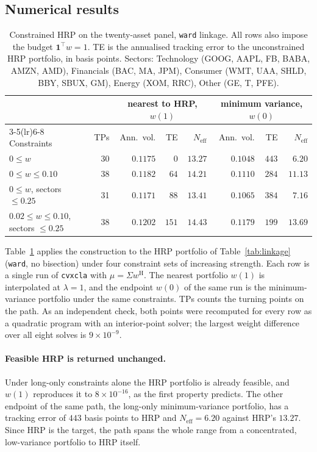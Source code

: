 \documentclass[11pt,a4paper]{article}
\newcommand{\code}[1]{\texttt{#1}}
\begin{document}
\subsection{Numerical results}

\begin{table}[htb]
\centering
\caption{Constrained HRP on the twenty-asset panel, \code{ward} linkage. All
rows also impose the budget $\mathbf{1}^{\top} w = 1$. TE is the annualised
tracking error to the unconstrained HRP portfolio, in basis points. Sectors:
Technology (GOOG, AAPL, FB, BABA, AMZN, AMD), Financials (BAC, MA, JPM),
Consumer (WMT, UAA, SHLD, BBY, SBUX, GM), Energy (XOM, RRC), Other (GE, T,
PFE).}
\label{tab:cla}
\begin{tabular}{lrrrrrrr}
\toprule
& & \multicolumn{3}{c}{nearest to HRP, $w(1)$}
  & \multicolumn{3}{c}{minimum variance, $w(0)$} \\
\cmidrule(lr){3-5}\cmidrule(lr){6-8}
Constraints & TPs & Ann.\ vol. & TE & $N_{\mathrm{eff}}$
  & Ann.\ vol. & TE & $N_{\mathrm{eff}}$ \\
\midrule
$0 \le w$                          & 30 & $0.1175$ & $0$   & $13.27$ & $0.1048$ & $443$ & $6.20$ \\
$0 \le w \le 0.10$                 & 38 & $0.1182$ & $64$  & $14.21$ & $0.1110$ & $284$ & $11.13$ \\
$0 \le w$, sectors $\le 0.25$      & 31 & $0.1171$ & $88$  & $13.41$ & $0.1065$ & $384$ & $7.16$ \\
$0.02 \le w \le 0.10$, sectors $\le 0.25$
                                   & 38 & $0.1202$ & $151$ & $14.43$ & $0.1179$ & $199$ & $13.69$ \\
\bottomrule
\end{tabular}
\end{table}

Table~\ref{tab:cla} applies the construction to the HRP portfolio of
Table~\ref{tab:linkage} (\code{ward}, no bisection) under four constraint sets
of increasing strength. Each row is a single run of \code{cvxcla}
\citep{cvxcla} with
$\mu = \Sigma w^{\mathrm{H}}$. The nearest portfolio $w(1)$ is interpolated at
$\lambda = 1$, and the endpoint $w(0)$ of the same run is the minimum-variance
portfolio under the same constraints. TPs counts the turning points on the
path. As an independent check, both points were recomputed for every row as a
quadratic program with an interior-point solver; the largest weight difference
over all eight solves is $9 \times 10^{-9}$.

\paragraph{Feasible HRP is returned unchanged.}
Under long-only constraints alone the HRP portfolio is already feasible, and
$w(1)$ reproduces it to $8 \times 10^{-16}$, as the first property predicts.
The other endpoint of the same path, the long-only minimum-variance portfolio,
has a tracking error of $443$ basis points to HRP and $N_{\mathrm{eff}} = 6.20$
against HRP's $13.27$. Since HRP is the target, the path spans the whole range
from a concentrated, low-variance portfolio to HRP itself.
\end{document}
